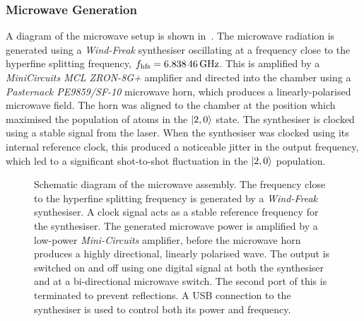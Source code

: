 \subsubsection{Microwave Generation}
A diagram of the microwave setup is shown
in~. The microwave radiation is
generated using a \textit{Wind-Freak} synthesiser oscillating at a frequency close to the hyperfine
splitting frequency, \(f_\text{hfs} =
\sivalue{6.83846}{\giga\hertz}\). This is amplified by a
\textit{MiniCircuits MCL ZRON-8G+} amplifier and directed into the
chamber using a \textit{Pasternack PE9859/SF-10} microwave horn, which
produces a linearly-polarised microwave field. The horn was aligned to
the chamber at the position which maximised the population of atoms in
the \(\ket{2,0}\) state. The synthesiser is clocked using a stable
 signal from the \Muquans{} laser. When the
synthesiser was clocked using its internal 
reference clock, this produced a noticeable jitter in the output
frequency, which led to a significant shot-to-shot fluctuation in the
\(\ket{2,0}\) population.
\begin{figure}[!htbp]
    \centering
    \resizebox{0.5\textwidth}{!}{}
    \caption[Setup for Microwaves]{Schematic diagram of the microwave
    assembly. The frequency close to the hyperfine splitting frequency
  is generated by a \textit{Wind-Freak} synthesiser. A
 clock signal acts as a stable reference
frequency for the synthesiser. The generated microwave power is
amplified by a low-power \textit{Mini-Circuits}
amplifier, before the microwave horn produces a highly
directional, linearly polarised wave. The output is switched on and
off using one 
digital signal at both the synthesiser and at a bi-directional
microwave switch. The second port of this is terminated to prevent reflections. A USB connection 
to the synthesiser is used to control both its power and frequency.}
    \label{fig:microwave_setup}
\end{figure}
